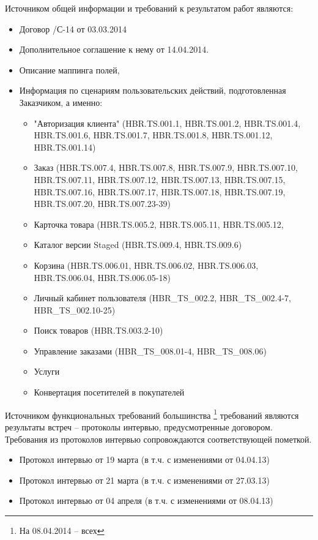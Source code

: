 
Источником общей информации и требований к результатом работ являются:
\begin{itemize}
\item Договор /С-14 от 03.03.2014
\item Дополнительное соглашение к нему  от 14.04.2014. 
\item Описание маппинга полей,
\item Информация по сценариям пользовательских действий, подготовленная Заказчиком, а именно:
\begin{itemize} 
  \item "Авторизация клиента" (HBR.TS.001.1, HBR.TS.001.2, HBR.TS.001.4, HBR.TS.001.6, HBR.TS.001.7, HBR.TS.001.8, HBR.TS.001.12, HBR.TS.001.14)
  \item Заказ (HBR.TS.007.4, HBR.TS.007.8, HBR.TS.007.9, HBR.TS.007.10, HBR.TS.007.11, HBR.TS.007.12, HBR.TS.007.13, HBR.TS.007.15, HBR.TS.007.16, HBR.TS.007.17, HBR.TS.007.18, HBR.TS.007.19, HBR.TS.007.20, HBR.TS.007.23-39) 
 \item  Карточка товара (HBR.TS.005.2, HBR.TS.005.11, HBR.TS.005.12, 
 \item  Каталог версии Staged (HBR.TS.009.4, HBR.TS.009.6)
 \item Корзина (HBR.TS.006.01, HBR.TS.006.02, HBR.TS.006.03, HBR.TS.006.04, HBR.TS.006.05-18)
\item Личный кабинет пользователя (HBR_TS_002.2, HBR_TS_002.4-7, HBR_TS_002.10-25)
\item Поиск товаров (HBR.TS.003.2-10)
\item Управление заказами (HBR_TS_008.01-4, HBR_TS_008.06)
\item Услуги
\item Конвертация посетителей в покупателей
\end{itemize}
\end{itemize}

Источником функциональных требований большинства \footnote{На 08.04.2014 -- всех} требований являются результаты встреч -- протоколы интервью, предусмотренные договором. Требования из протоколов интервью сопровождаются соответствующей пометкой. 

\begin{itemize}
\item Протокол интервью от 19 марта (в т.ч. с изменениями от 04.04.13)
\item Протокол интервью от 21 марта (в т.ч. с изменениями от 27.03.13)
\item Протокол интервью от 04 апреля (в т.ч. с изменениями от 08.04.13)
\end{itemize}

